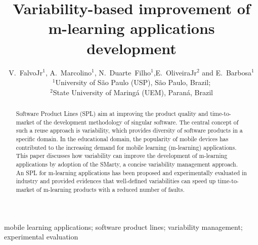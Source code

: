 \documentclass{kais}
\begin{document}
\label{firstpage}

\title{Variability-based improvement of m-learning applications development}

\author[FalvoJr et al]{V.~FalvoJr$^1$, A.~Marcolino$^1$, N.~Duarte~Filho$^1$,E.~OliveiraJr$^2$ and
E.~Barbosa$^1$\\ $^1$University of S\~ao Paulo (USP), S\~ao Paulo, Brazil;\\$^2$State University of Maring\'a (UEM), Paran\'a, Brazil}
 
\maketitle

\begin{abstract}
Software Product Lines (SPL) aim at improving the product quality and time-to-market of the development methodology of singular software. The central concept of such a reuse approach is variability, which provides diversity of software products in a specific domain. In the educational domain, the popularity of mobile devices has contributed to the increasing demand for mobile learning (m-learning) applications. This paper discusses how variability can improve the development of m-learning applications by adoption of the SMarty, a concise variability management approach. An SPL for m-learning applications has been proposed and experimentally evaluated in industry and provided evidences that well-defined variabilities can speed up time-to-market of m-learning products with a reduced number of faults.
\end{abstract}

\begin{keywords}
mobile learning applications; software product lines; variability management; experimental evaluation
\end{keywords}
















\end{document}
